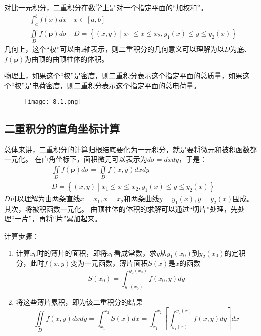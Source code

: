 对比一元积分，二重积分在数学上是对一个指定平面的“加权和”。
\begin{align*}
&\int_a^b{f\left( x \right) dx} \quad x\in \left[ a,b \right] \\
&\iint\limits_D{f\left( \boldsymbol{p} \right) d\sigma} \quad D=\left\{ \left( x,y \right) \middle| x_1\leqslant x\leqslant x_2,y_1\left( x \right) \leqslant y\leqslant y_2\left( x \right) \right\}
\end{align*}
几何上，这个“权”可以由{\it z}轴表示，则二重积分的几何意义可以理解为以$D$为底、$f\left( \boldsymbol{p} \right) $为曲顶的曲顶柱体的体积。

物理上，如果这个“权”是密度，则二重积分表示这个指定平面的总质量，如果这个“权”是电荷密度，则二重积分表示这个指定平面的总电荷量。

\begin{figure}[h]
\centering
\texttt{[image: 8.1.png]}
\end{figure}

\subsection{二重积分的直角坐标计算}

总体来讲，二重积分的计算归根结底要化为一元积分，就是要将微元和被积函数都一元化。
在直角坐标下，面积微元可以表示为$d\sigma =dxdy$，于是：
\begin{align*}
&\iint\limits_D{f\left( \boldsymbol{p} \right) d\sigma}=\iint\limits_D{f\left( x,y \right) dxdy} \\
&D=\left\{ \left( x,y \right) \middle| x_1\leqslant x\leqslant x_2,y_1\left( x \right) \leqslant y\leqslant y_2\left( x \right) \right\}
\end{align*}
$D$可以理解为由两条直线$x=x_1,x=x_2$和两条曲线$y=y_1\left( x \right) ,y=y_2\left( x \right) $围成。
其次，将被积函数一元化。
曲顶柱体的体积的求解可以通过“切片”处理，先处理“一片”，再将“片”累加起来。

计算步骤：
\begin{enumerate}
    \item 计算$x_0$时的薄片的面积，即将$x_0$看成常数，求$y$从$y_1\left( x_0 \right) $到$y_2\left( x_0 \right) $的定积分，此时$f\left( x,y \right) $变为一元函数，薄片面积$S\left( x \right) $是$x$的函数
    \[
    S\left( x_0 \right) =\int_{y_1\left( x_0 \right)}^{y_2\left( x_0 \right)}{f\left( x_0,y \right) dy}
    \]
    \item 将这些薄片累积，即为该二重积分的结果
    \[
    \iint\limits_D{f\left( x,y \right) dxdy}=\int_{x_1}^{x_2}{S\left( x \right) dx}=\int_{x_1}^{x_2}{\left[ \int_{y_1\left( x \right)}^{y_2\left( x \right)}{f\left( x,y \right) dy} \right] dx}
    \]
\end{enumerate}

